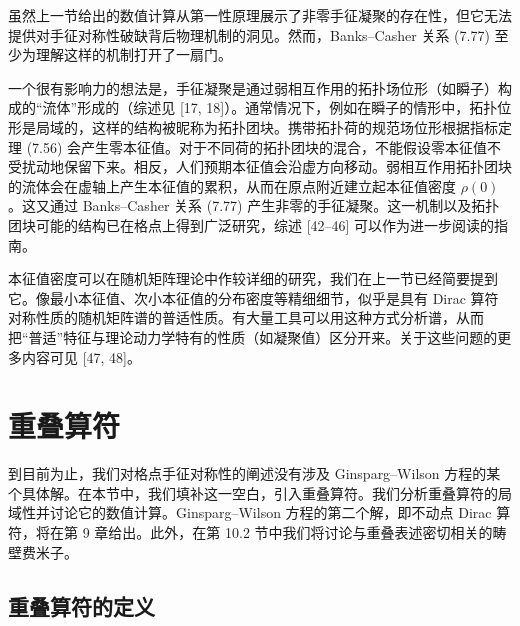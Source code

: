 虽然上一节给出的数值计算从第一性原理展示了非零手征凝聚的存在性，但它无法提供对手征对称性破缺背后物理机制的洞见。然而，Banks--Casher 关系 (7.77) 至少为理解这样的机制打开了一扇门。

一个很有影响力的想法是，手征凝聚是通过弱相互作用的拓扑场位形（如瞬子）构成的``流体''形成的（综述见 [17, 18]）。通常情况下，例如在瞬子的情形中，拓扑位形是局域的，这样的结构被昵称为拓扑团块。携带拓扑荷的规范场位形根据指标定理 (7.56) 会产生零本征值。对于不同荷的拓扑团块的混合，不能假设零本征值不受扰动地保留下来。相反，人们预期本征值会沿虚方向移动。弱相互作用拓扑团块的流体会在虚轴上产生本征值的累积，从而在原点附近建立起本征值密度 $\rho(0)$。这又通过 Banks--Casher 关系 (7.77) 产生非零的手征凝聚。这一机制以及拓扑团块可能的结构已在格点上得到广泛研究，综述 [42--46] 可以作为进一步阅读的指南。

本征值密度可以在随机矩阵理论中作较详细的研究，我们在上一节已经简要提到它。像最小本征值、次小本征值的分布密度等精细细节，似乎是具有 Dirac 算符对称性质的随机矩阵谱的普适性质。有大量工具可以用这种方式分析谱，从而把``普适''特征与理论动力学特有的性质（如凝聚值）区分开来。关于这些问题的更多内容可见 [47, 48]。

\section{重叠算符}

到目前为止，我们对格点手征对称性的阐述没有涉及 Ginsparg--Wilson 方程的某个具体解。在本节中，我们填补这一空白，引入重叠算符。我们分析重叠算符的局域性并讨论它的数值计算。Ginsparg--Wilson 方程的第二个解，即不动点 Dirac 算符，将在第 9 章给出。此外，在第 10.2 节中我们将讨论与重叠表述密切相关的畴壁费米子。

\subsection{重叠算符的定义}

